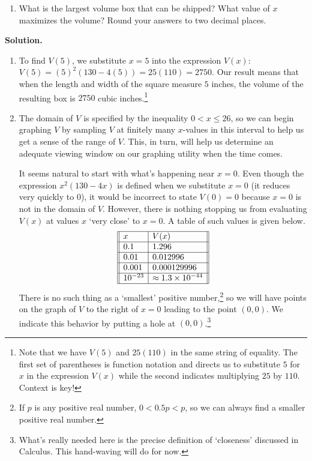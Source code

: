 \documentclass{ximera}
\begin{document}
\begin{example}
\begin{enumerate}
\item  What is the largest volume box that can be shipped?  What value of $x$ maximizes the volume?  Round your answers to two decimal places.

\end{enumerate}
{\bf Solution.}

\begin{enumerate}

\item To find $V(5)$, we substitute $x=5$ into the expression $V(x)$:  $V(5) = (5)^2 (130-4(5)) = 25(110) = 2750$.   Our result means that when the length and width of the square  measure $5$ inches, the volume of the resulting box is $2750$ cubic inches.\footnote{Note that we have $V(5)$ and $25(110)$ in the same string of equality. The first set of parentheses is function notation and directs us to substitute $5$ for $x$ in the expression $V(x)$ while the second indicates multiplying $25$ by $110$. Context is key!}

\item The domain of $V$ is specified by the inequality  $0 < x \leq 26$, so we can begin graphing $V$ by sampling  $V$ at finitely many $x$-values in this interval to help us get a sense of the range of $V$. This, in turn, will help us determine an adequate viewing window on our graphing utility when the time comes.

It seems natural to start with what's happening near $x = 0$.  Even though the expression $x^2 (130-4x)$  is defined when we substitute $x = 0$ (it reduces very quickly to $0$), it would be incorrect to state $V(0) = 0$ because $x = 0$ is not in the domain of $V$.  However,  there is nothing stopping us from evaluating $V(x)$ at values $x$ `very close' to $x = 0$.  A table of such values is given below. \[ \begin{array}{||l|l||} \hline 
        x & V(x) \\ \hline
      0.1 & 1.296 \\ \hline
     0.01 & 0.012996 \\ \hline
    0.001 & 0.000129996 \\ \hline
10^{-23} & \approx 1.3 \times 10^{-44} \\ \hline

\end{array} \] There is no such thing as a  `smallest' positive number,\footnote{If $p$ is any positive real number, $0 < 0.5 p < p$, so we can always find a smaller positive real number.}  so we will have points on the graph of $V$ to the right of $x = 0$ leading to the point $(0,0)$.  We indicate this behavior by putting a hole at $(0,0)$.\footnote{What's really needed here is the precise definition of `closeness' discussed in Calculus.  This hand-waving will do for now.}


\end{enumerate}
\end{example}
\end{document}
